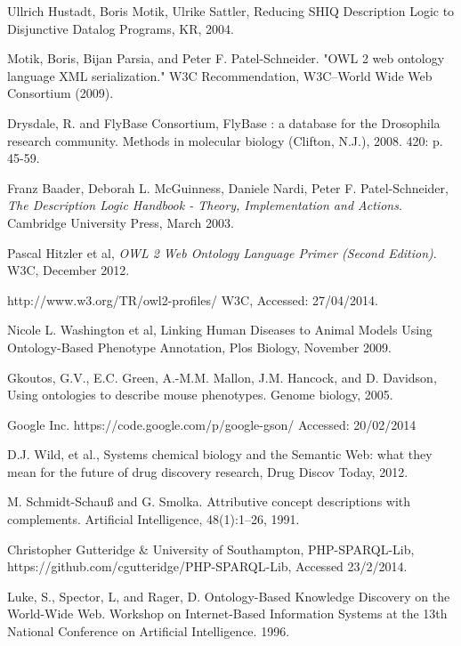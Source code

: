 \documentclass{article}
\begin{document}
\begin{thebibliography}{9}
  Ullrich Hustadt, Boris Motik, Ulrike Sattler,
  Reducing SHIQ Description Logic to Disjunctive Datalog Programs,
  KR,
  2004.

  Motik, Boris, Bijan Parsia, and Peter F. Patel-Schneider. "OWL 2 web ontology
  language XML serialization." W3C Recommendation, W3C–World Wide Web Consortium
  (2009).

  Drysdale, R. and FlyBase Consortium, FlyBase : a database for the Drosophila research community.
  Methods in molecular biology (Clifton, N.J.), 2008. 420: p. 45-59.

 Franz Baader, Deborah L. McGuinness, Daniele Nardi, Peter F. Patel-Schneider,
 \emph{The Description Logic Handbook - Theory, Implementation and Actions}.
 Cambridge University Press,
 March 2003.

  Pascal Hitzler et al,
  \emph{OWL 2 Web Ontology Language Primer (Second Edition)}.
  W3C,
  December 2012.

  http://www.w3.org/TR/owl2-profiles/
  W3C,
  Accessed: 27/04/2014.

  Nicole L. Washington et al,
  Linking Human Diseases to Animal Models Using Ontology-Based Phenotype Annotation,
  Plos Biology,
  November 2009.

  Gkoutos, G.V., E.C. Green, A.-M.M. Mallon, J.M. Hancock, and D. Davidson,
  Using ontologies to describe mouse phenotypes. 
  Genome biology, 
  2005.

  Google Inc.
  https://code.google.com/p/google-gson/
  Accessed: 20/02/2014

  D.J. Wild, et al.,
  Systems chemical biology and the Semantic Web: what they mean for the future of drug discovery research,
  Drug Discov Today,
  2012.

  M. Schmidt-Schauß and G. Smolka. 
  Attributive concept descriptions with complements.
  Artificial Intelligence, 48(1):1–26, 1991.

  Christopher Gutteridge \& University of Southampton,
  PHP-SPARQL-Lib,
  https://github.com/cgutteridge/PHP-SPARQL-Lib,
  Accessed 23/2/2014.

  Luke, S., Spector, L, and Rager, D. 
  Ontology-Based Knowledge Discovery on the World-Wide Web. 
  Workshop on Internet-Based Information Systems at the 13th National Conference on Artificial Intelligence. 
  1996.


\end{thebibliography}
\end{document}
